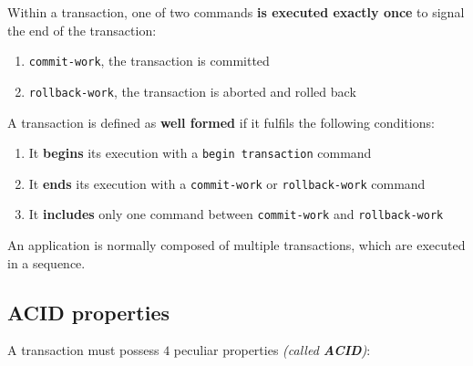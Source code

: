 \documentclass[english]{article}
\begin{document}
Within a transaction, one of two commands \textbf{is executed exactly once} to signal the end of the transaction:

\begin{enumerate}
  \item \texttt{commit-work}, the transaction is committed
  \item \texttt{rollback-work}, the transaction is aborted and rolled back
\end{enumerate}

A transaction is defined as \textbf{well formed} if it fulfils the following conditions:

\begin{enumerate}
  \item It \textbf{begins} its execution with a \texttt{begin transaction} command
  \item It \textbf{ends} its execution with a \texttt{commit-work} or \texttt{rollback-work} command
  \item It \textbf{includes} only one command between \texttt{commit-work} and \texttt{rollback-work}
\end{enumerate}

An application is normally composed of multiple transactions, which are executed in a sequence.

\subsection{ACID properties}

A transaction must possess \(4\) peculiar properties \textit{(called \textbf{ACID})}:
\end{document}
